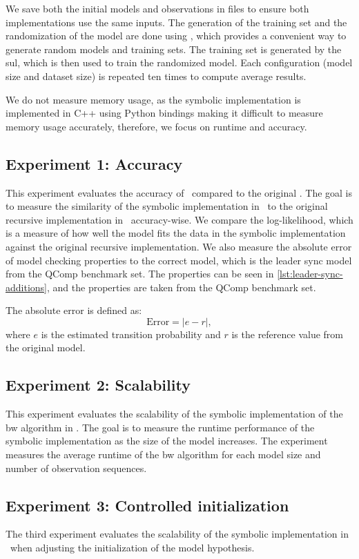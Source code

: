 We save both the initial models and observations in files to ensure both implementations use the same inputs.
The generation of the training set and the randomization of the model are done using \Jajapy, which provides a convenient way to generate random models and training sets.
The training set is generated by the \gls{sul}, which is then used to train the randomized model.
Each configuration (model size and dataset size) is repeated ten times to compute average results.

We do not measure memory usage, as the symbolic implementation is implemented in C++ using Python bindings making it difficult to measure memory usage accurately, therefore, we focus on runtime and accuracy.


\subsection{Experiment 1: Accuracy}\label{sec:exp_accuracy}
This experiment evaluates the accuracy of \Cupaal\ compared to the original \Jajapy.
The goal is to measure the similarity of the symbolic implementation in \Cupaal\ to the original recursive implementation in \Jajapy\ accuracy-wise.
We compare the log-likelihood, which is a measure of how well the model fits the data in the symbolic implementation against the original recursive implementation.
We also measure the absolute error of model checking properties to the correct model, which is the leader sync model from the QComp benchmark set.
The properties can be seen in \autoref{lst:leader-sync-additions}, and the properties are taken from the QComp benchmark set.

The absolute error is defined as:
\[
    \text{Error} = |e - r|,
\]
where $e$ is the estimated transition probability and $r$ is the reference value from the original model.

\subsection{Experiment 2: Scalability}\label{sec:exp_scalability}
This experiment evaluates the scalability of the symbolic implementation of the \gls{bw} algorithm in \Cupaal.
The goal is to measure the runtime performance of the symbolic implementation as the size of the model increases.
The experiment measures the average runtime of the \gls{bw} algorithm for each model size and number of observation sequences.

\subsection{Experiment 3: Controlled initialization}\label{sec:exp_extra_scalability}
The third experiment evaluates the scalability of the symbolic implementation in \Cupaal\ when adjusting the initialization of the model hypothesis.

